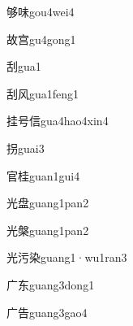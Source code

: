 \begin{verbete}[11;8]{够味}{gou4wei4}
\end{verbete}

\begin{verbete*}[9;9]{故宫}{gu4gong1}
\end{verbete*}

\begin{verbete}[8]{刮}{gua1}
\end{verbete}

\begin{verbete}[8;4]{刮风}{gua1feng1}
\end{verbete}

\begin{verbete}[9;5;9]{挂号信}{gua4hao4xin4}
\end{verbete}

\begin{verbete}[8]{拐}{guai3}
\end{verbete}

\begin{verbete}[8;10]{官桂}{guan1gui4}
\end{verbete}

\begin{verbete}[6;11]{光盘}{guang1pan2}
\end{verbete}

\begin{verbete}[6;14]{光槃}{guang1pan2}
\end{verbete}

\begin{verbete}[6;6;9]{光污染}{guang1·wu1ran3}
\end{verbete}

\begin{verbete*}[3;5]{广东}{guang3dong1}
\end{verbete*}

\begin{verbete}[3;7]{广告}{guang3gao4}
\end{verbete}

